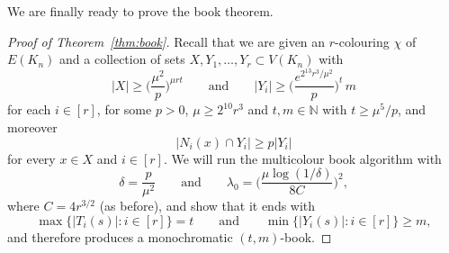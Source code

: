 \documentclass[12pt,reqno]{amsart}
\theoremstyle{definition}
\theoremstyle{remark}
\newcommand\N{\mathbb{N}}
\renewcommand{\ge}{\geqslant}
\def\N{\mathbb{N}}
\begin{document}
We are finally ready to prove the book theorem. 

\begin{proof}[Proof of Theorem~\ref{thm:book}]
Recall that we are given an $r$-colouring $\chi$ of $E(K_n)$ and a collection of %
sets $X,Y_1,\ldots,Y_r \subset V(K_n)$ with
\begin{equation}\label{eq:book:thm:conditions}
|X| \ge \bigg( \frac{\mu^2}{p} \bigg)^{\mu r t} \qquad \text{and} \qquad |Y_i| \ge \bigg( \frac{e^{2^{13} r^3 / \mu^2}}{p} \bigg)^t \, m
\end{equation}
for each $i \in [r]$, for some $p > 0$, $\mu \ge 2^{10} r^3$ and $t,m \in \N$ with $t \ge \mu^5 / p$, and moreover
\begin{equation}\label{eq:book:thm:min:degree}
|N_i(x) \cap Y_i| \ge p|Y_i|
\end{equation}
for every $x \in X$ and $i \in [r]$. 
We will run the multicolour book algorithm with
$$\delta = \frac{p}{\mu^2} \qquad \text{and} \qquad \lambda_0 = \bigg( \frac{\mu \log(1/\delta)}{8C} \bigg)^2,$$
where $C = 4r^{3/2}$ (as before), and show that it ends with
$$\max \big\{ |T_i(s)| : i \in [r] \big\} = t \qquad \text{and} \qquad \min\big\{ |Y_i(s)| : i \in [r] \big\} \ge m,$$
and therefore produces a monochromatic $(t,m)$-book.


\end{proof}
\end{document}
